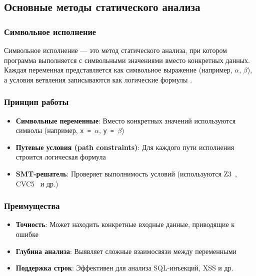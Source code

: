 \subsection{Основные методы статического анализа}

\subsubsection{Символьное исполнение}
Символьное исполнение — это метод статического анализа, при котором программа выполняется с символьными значениями вместо конкретных данных. Каждая переменная представляется как символьное выражение (например, $\alpha$, $\beta$), а условия ветвления записываются как логические формулы \cite{King76}.

\subsubsection{Принцип работы}
\begin{itemize}
    \item \textbf{Символьные переменные}: Вместо конкретных значений используются символы (например, \texttt{x = $\alpha$}, \texttt{y = $\beta$})
    \item \textbf{Путевые условия (path constraints)}: Для каждого пути исполнения строится логическая формула
    \item \textbf{SMT-решатель}: Проверяет выполнимость условий (используются Z3~\cite{Z3}, CVC5~\cite{CVC5} и др.)
\end{itemize}


\subsubsection{Преимущества}
\begin{itemize}
    \item \textbf{Точность}: Может находить конкретные входные данные, приводящие к ошибке
    \item \textbf{Глубина анализа}: Выявляет сложные взаимосвязи между переменными
    \item \textbf{Поддержка строк}: Эффективен для анализа SQL-инъекций, XSS и др.
\end{itemize}


